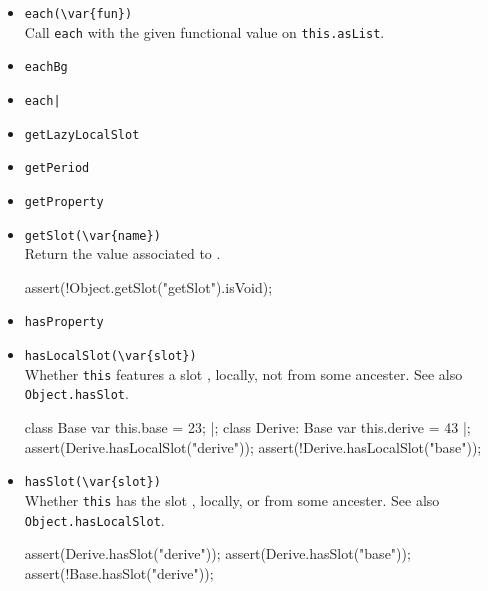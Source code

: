 \begin{itemize}
\item \lstinline|each(\var{fun})|\\
  Call \lstinline|each| with the given functional value on
  \lstinline|this.asList|.

\item \lstinline|eachBg|\\

\item \lstinline$each|$\\

\item \lstinline|getLazyLocalSlot|\\

\item \lstinline|getPeriod|\\

\item \lstinline|getProperty|\\

\item \lstinline|getSlot(\var{name})|\\
  Return the value associated to .

\begin{urbiscript}[firstnumber=last]
assert(!Object.getSlot("getSlot").isVoid);
\end{urbiscript}

\item \lstinline|hasProperty|\\

\item \lstinline|hasLocalSlot(\var{slot})|\\
  Whether \lstinline|this| features a slot , locally, not
  from some ancester.  See also \lstinline|Object.hasSlot|.

\begin{urbiscript}[firstnumber=last]
class Base         { var this.base = 23; } |;
class Derive: Base { var this.derive = 43 } |;
assert(Derive.hasLocalSlot("derive"));
assert(!Derive.hasLocalSlot("base"));
\end{urbiscript}

\item \lstinline|hasSlot(\var{slot})|\\
  Whether \lstinline|this| has the slot , locally, or from
  some ancester.  See also \lstinline|Object.hasLocalSlot|.

\begin{urbiscript}[firstnumber=last]
assert(Derive.hasSlot("derive"));
assert(Derive.hasSlot("base"));
assert(!Base.hasSlot("derive"));
\end{urbiscript}


\end{itemize}

